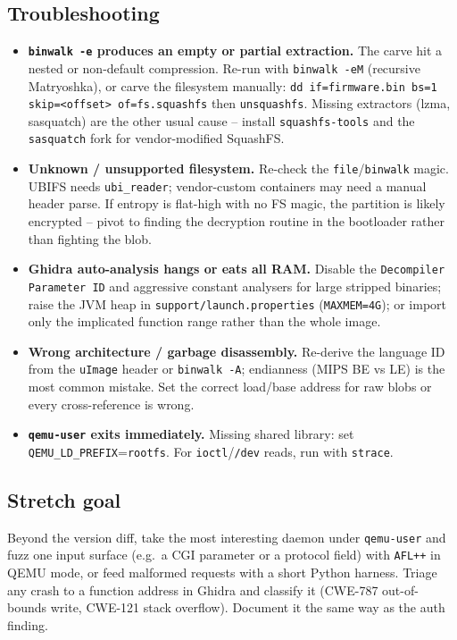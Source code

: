 \documentclass[11pt,a4paper]{article}
\begin{document}
\subsection*{Troubleshooting}
\begin{itemize}\setlength{\itemsep}{1pt}
  \item \textbf{\texttt{binwalk -e} produces an empty or partial
        extraction.} The carve hit a nested or non-default
        compression. Re-run with \texttt{binwalk -eM} (recursive
        Matryoshka), or carve the filesystem manually:
        \texttt{dd if=firmware.bin bs=1 skip=<offset> of=fs.squashfs}
        then \texttt{unsquashfs}. Missing extractors (lzma, sasquatch)
        are the other usual cause -- install \texttt{squashfs-tools}
        and the \texttt{sasquatch} fork for vendor-modified SquashFS.
  \item \textbf{Unknown / unsupported filesystem.} Re-check the
        \texttt{file}/\texttt{binwalk} magic. UBIFS needs
        \texttt{ubi\_reader}; vendor-custom containers may need a
        manual header parse. If entropy is flat-high with no FS magic,
        the partition is likely encrypted -- pivot to finding the
        decryption routine in the bootloader rather than fighting the
        blob.
  \item \textbf{Ghidra auto-analysis hangs or eats all RAM.} Disable
        the \texttt{Decompiler Parameter ID} and aggressive constant
        analysers for large stripped binaries; raise the JVM heap in
        \texttt{support/launch.properties}
        (\texttt{MAXMEM=4G}); or import only the implicated function
        range rather than the whole image.
  \item \textbf{Wrong architecture / garbage disassembly.} Re-derive
        the language ID from the \texttt{uImage} header or
        \texttt{binwalk -A}; endianness (MIPS BE vs LE) is the most
        common mistake. Set the correct load/base address for raw
        blobs or every cross-reference is wrong.
  \item \textbf{\texttt{qemu-user} exits immediately.} Missing shared
        library: set \texttt{QEMU\_LD\_PREFIX}\allowbreak{}=\allowbreak\texttt{rootfs}.
        For \texttt{ioctl}/\texttt{/dev} reads, run with \texttt{strace}.
\end{itemize}

\subsection*{Stretch goal}
Beyond the version diff, take the most interesting daemon under
\texttt{qemu-user} and fuzz one input surface (e.g.\ a CGI parameter or
a protocol field) with \texttt{AFL++} in QEMU mode, or feed malformed
requests with a short Python harness. Triage any crash to a function
address in Ghidra and classify it (CWE-787 out-of-bounds write,
CWE-121 stack overflow). Document it the same way as the auth finding.
\end{document}
